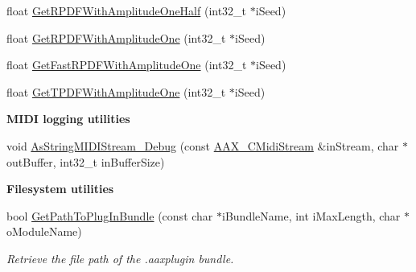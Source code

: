 \begin{DoxyCompactItemize}
float \hyperlink{a00288_a5a91375167236862abc93ad879639cab}{Get\+R\+P\+D\+F\+With\+Amplitude\+One\+Half} (int32\+\_\+t $\ast$i\+Seed)
\item 
float \hyperlink{a00288_a51d7a263d9053276c6cef1dbd2018ebe}{Get\+R\+P\+D\+F\+With\+Amplitude\+One} (int32\+\_\+t $\ast$i\+Seed)
\item 
float \hyperlink{a00288_a145cc6d06cd682e2d234d07ce939760e}{Get\+Fast\+R\+P\+D\+F\+With\+Amplitude\+One} (int32\+\_\+t $\ast$i\+Seed)
\item 
float \hyperlink{a00288_a42cc414ea1b868e26c591041a66ad8af}{Get\+T\+P\+D\+F\+With\+Amplitude\+One} (int32\+\_\+t $\ast$i\+Seed)
\end{DoxyCompactItemize}
\begin{Indent}{\bf M\+I\+D\+I logging utilities}\par
\begin{DoxyCompactItemize}
\item 
void \hyperlink{a00370_ga5b2751acd531f46a0e4dd68cd0863f46}{As\+String\+M\+I\+D\+I\+Stream\+\_\+\+Debug} (const \hyperlink{a00025}{A\+A\+X\+\_\+\+C\+Midi\+Stream} \&in\+Stream, char $\ast$out\+Buffer, int32\+\_\+t in\+Buffer\+Size)
\end{DoxyCompactItemize}
\end{Indent}
\begin{Indent}{\bf Filesystem utilities}\par
\begin{DoxyCompactItemize}
\item 
bool \hyperlink{a00370_ga0bf6aab757ecbd440276bb001de89f19}{Get\+Path\+To\+Plug\+In\+Bundle} (const char $\ast$i\+Bundle\+Name, int i\+Max\+Length, char $\ast$o\+Module\+Name)
\begin{DoxyCompactList}\small\item\em Retrieve the file path of the .aaxplugin bundle. \end{DoxyCompactList}\end{DoxyCompactItemize}
\end{Indent}
